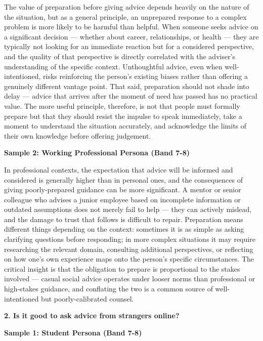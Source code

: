 The value of preparation before giving advice depends heavily on the nature of the situation, but as a general principle, an unprepared response to a complex problem is more likely to be harmful than helpful. When someone seeks advice on a significant decision — whether about career, relationships, or health — they are typically not looking for an immediate reaction but for a considered perspective, and the quality of that perspective is directly correlated with the adviser's understanding of the specific context. Unthoughtful advice, even when well-intentioned, risks reinforcing the person's existing biases rather than offering a genuinely different vantage point. That said, preparation should not shade into delay — advice that arrives after the moment of need has passed has no practical value. The more useful principle, therefore, is not that people must formally prepare but that they should resist the impulse to speak immediately, take a moment to understand the situation accurately, and acknowledge the limits of their own knowledge before offering judgement.

\textbf{Sample 2: Working Professional Persona (Band 7-8)}

In professional contexts, the expectation that advice will be informed and considered is generally higher than in personal ones, and the consequences of giving poorly-prepared guidance can be more significant. A mentor or senior colleague who advises a junior employee based on incomplete information or outdated assumptions does not merely fail to help — they can actively mislead, and the damage to trust that follows is difficult to repair. Preparation means different things depending on the context: sometimes it is as simple as asking clarifying questions before responding; in more complex situations it may require researching the relevant domain, consulting additional perspectives, or reflecting on how one's own experience maps onto the person's specific circumstances. The critical insight is that the obligation to prepare is proportional to the stakes involved — casual social advice operates under looser norms than professional or high-stakes guidance, and conflating the two is a common source of well-intentioned but poorly-calibrated counsel.

\separator

\begin{ieltsquestion}
\textbf{2. Is it good to ask advice from strangers online?}
\end{ieltsquestion}
\textbf{Sample 1: Student Persona (Band 7-8)}

